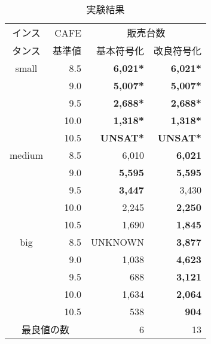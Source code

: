 \begin{table}[tb]
 \caption{実験結果}
 \centering
 \begin{tabular}{c|r|rr} \bhline
  インス & CAFE & \multicolumn{2}{c}{販売台数} \\ \cline{3-4}
  タンス & 基準値                & 基本符号化 & 改良符号化 \\\hline    
  small & 8.5   & \textbf{6,021*}       & \textbf{6,021*}       \\
   & 9.0   & \textbf{5,007*}       & \textbf{5,007*}       \\
   & 9.5   & \textbf{2,688*}       & \textbf{2,688*}       \\
   & 10.0  & \textbf{1,318*}       & \textbf{1,318*}       \\
   & 10.5  & \textbf{UNSAT*}       & \textbf{UNSAT*}       \\ \hline
  medium & 8.5  & 6,010        & \textbf{6,021}        \\
   & 9.0  & \textbf{5,595}        & \textbf{5,595}        \\
   & 9.5  & \textbf{3,447}        & 3,430        \\
   & 10.0 & 2,245        & \textbf{2,250}        \\
   & 10.5 & 1,690        & \textbf{1,845}        \\ \hline
  big & 8.5     & UNKNOWN     & \textbf{3,877}        \\
   & 9.0     & 1,038        & \textbf{4,623}        \\
   & 9.5     & 688         & \textbf{3,121}        \\
   & 10.0    & 1,634        & \textbf{2,064}        \\
   & 10.5    & 538         & \textbf{904}         \\ \hline \hline
  \multicolumn{2}{c}{最良値の数} & 6 & 13         \\ \hline
 \end{tabular}
 \label{tab:result}
\end{table}

